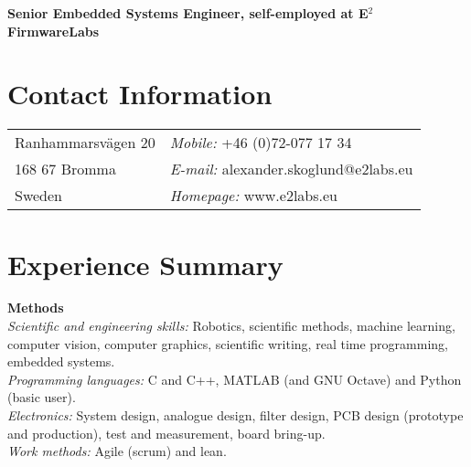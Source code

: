 \documentclass[a4paper,margin,line]{res} \usepackage{latexsym}
\begin{document}
\vspace*{.1in} 

\begin{resume}
\hspace{-34mm}
{\bf \large Senior Embedded Systems Engineer, self-employed at E$^2$ FirmwareLabs}


\section{\sc Contact Information}
\vspace{.05in}
\begin{tabular}{@{}p{3in}p{3in}}
  Ranhammarsv\"agen 20 & {\it Mobile:} +46 (0)72-077 17 34 \\
  168 67 Bromma & {\it E-mail:} alexander.skoglund@e2labs.eu \\
  Sweden & {\it Homepage:} www.e2labs.eu \\
\end{tabular}



\section{\sc Experience Summary}

{\bf Methods}\\ {\em Scientific and engineering skills:} Robotics,
scientific methods, machine learning, computer vision, computer
graphics, scientific writing, real time programming, embedded
systems.\\ {\em Programming languages:} C and C++, {M}ATLAB (and GNU
Octave) and Python (basic user). \\ {\em Electronics:} System design,
analogue design, filter design, PCB design (prototype and production),
test and measurement, board bring-up.\\ {\em Work methods:} Agile
(scrum) and lean.


\end{resume}
\end{document}
